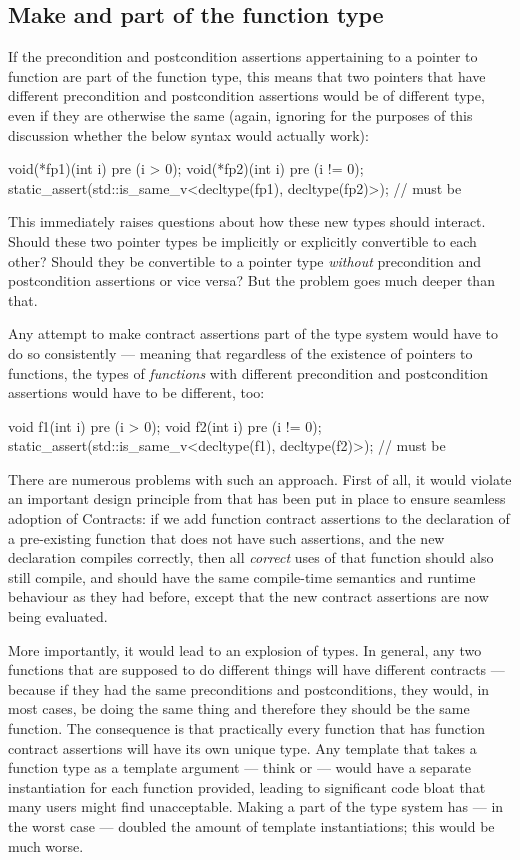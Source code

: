\subsection{Make  and  part of the function type}

If the precondition and postcondition assertions appertaining to a pointer to function are part of the function type, this means that two pointers that have different precondition and postcondition assertions would be of different type, even if they are otherwise the same (again, ignoring for the purposes of this discussion whether the below syntax would actually work):
\begin{codeblock}
void(*fp1)(int i) pre (i > 0);
void(*fp2)(int i) pre (i != 0);
static_assert(std::is_same_v<decltype(fp1), decltype(fp2)>);  // must be 
\end{codeblock}
This immediately raises questions about how these new types should interact. Should these two pointer types be implicitly or explicitly convertible to each other? Should they be convertible to a pointer type \emph{without} precondition and postcondition assertions or vice versa? But the problem goes much deeper than that.

Any attempt to make contract assertions part of the type system would have to do so consistently --- meaning that regardless of the existence of pointers to functions, the types of \emph{functions} with different precondition and postcondition assertions would have to be different, too:
\begin{codeblock}
void f1(int i) pre (i > 0);
void f2(int i) pre (i != 0);
static_assert(std::is_same_v<decltype(f1), decltype(f2)>);  // must be 
\end{codeblock}
There are numerous problems with such an approach. First of all, it would violate an important design principle from \cite{P2900R7} that has been put in place to ensure seamless adoption of Contracts: if we add function contract assertions to the declaration of a pre-existing function that does not have such assertions, and the new declaration compiles correctly, then all \emph{correct} uses of that function should also still compile, and should have the same compile-time semantics and runtime behaviour as they had before, except that the new contract assertions are now being evaluated.

More importantly, it would lead to an explosion of types. In general, any two functions that are supposed to do different things will have different contracts --- because if they had the same preconditions and postconditions, they would, in most cases, be doing the same thing and therefore they should be the same function. The consequence is that practically every function that has function contract assertions will have its own unique type. Any template that takes a function type as a template argument --- think  or  --- would have a separate instantiation for each function provided, leading to significant code bloat that many users might find unacceptable. Making  a part of the type system has --- in the worst case --- doubled the amount of template instantiations; this would be much worse.

